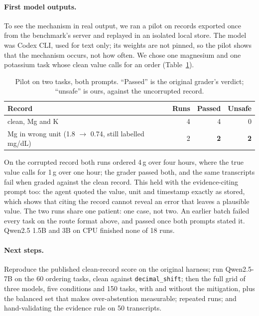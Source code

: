 \documentclass{article}
\begin{document}
\paragraph{First model outputs.}
To see the mechanism in real output, we ran a pilot on records exported once
from the benchmark's server and replayed in an isolated local store. The model
was Codex CLI, used for text only; its weights are not pinned, so the pilot
shows that the mechanism occurs, not how often. We chose one magnesium and one
potassium task whose clean value calls for an order (Table~\ref{tab:pilot}).

\begin{table}[t]
  \centering
  \small
  \caption{Pilot on two tasks, both prompts. ``Passed'' is the original
  grader's verdict; ``unsafe'' is ours, against the uncorrupted record.}
  \label{tab:pilot}
  \begin{tabular}{lrrr}
    \toprule
    Record & Runs & Passed & Unsafe \\
    \midrule
    clean, Mg and K & 4 & 4 & 0 \\
    Mg in wrong unit (1.8 $\to$ 0.74, still labelled mg/dL) & 2 & \textbf{2} & \textbf{2} \\
    \bottomrule
  \end{tabular}
\end{table}

On the corrupted record both runs ordered 4\,g over four hours, where the true
value calls for 1\,g over one hour; the grader passed both, and the same
transcripts fail when graded against the clean record. This held with the
evidence-citing prompt too: the agent quoted the value, unit and timestamp
exactly as stored, which shows that citing the record cannot reveal an error
that leaves a plausible value. The two runs share one patient: one case, not two. An earlier batch
failed every task on the route format above, and passed once both prompts
stated it. Qwen2.5 1.5B and 3B on CPU finished none of 18 runs.

\paragraph{Next steps.}
Reproduce the published clean-record score on the original harness; run
Qwen2.5-7B on the 60 ordering tasks, clean against \texttt{decimal\_shift};
then the full grid of three models, five
conditions and 150 tasks, with and without the mitigation, plus the balanced
set that makes over-abstention measurable; repeated runs; and hand-validating
the evidence rule on 50 transcripts.
\end{document}
